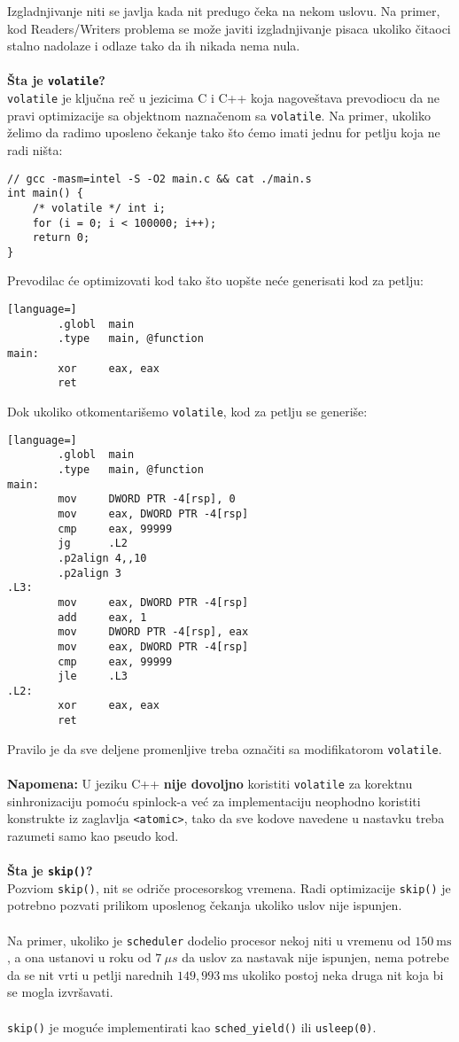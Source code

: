Izgladnjivanje niti se javlja kada nit predugo \v{c}eka na nekom uslovu. Na primer, kod Readers/Writers problema se mo\v{z}e javiti izgladnjivanje pisaca ukoliko \v{c}itaoci stalno nadolaze i odlaze tako da ih nikada nema nula.
\\\\
\textbf{\v{S}ta je \texttt{volatile}?}\\
\texttt{volatile} je klju\v{c}na re\v{c} u jezicima C i C++ koja nagove\v{s}tava prevodiocu da ne pravi optimizacije sa objektnom nazna\v{c}enom sa \texttt{volatile}.
Na primer, ukoliko \v{z}elimo da radimo uposleno \v{c}ekanje tako \v{s}to \'{c}emo imati jednu for petlju koja ne radi ni\v{s}ta:
\begin{lstlisting}
// gcc -masm=intel -S -O2 main.c && cat ./main.s
int main() {
    /* volatile */ int i;
    for (i = 0; i < 100000; i++);
    return 0;
}
\end{lstlisting}
Prevodilac \'{c}e optimizovati kod tako \v{s}to uop\v{s}te ne\'{c}e generisati kod za petlju:
\begin{lstlisting}[language=]
        .globl  main
        .type   main, @function
main:
        xor     eax, eax
        ret
\end{lstlisting}
Dok ukoliko otkomentari\v{s}emo \texttt{volatile}, kod za petlju se generi\v{s}e:
\begin{lstlisting}[language=]
        .globl  main
        .type   main, @function
main:
        mov     DWORD PTR -4[rsp], 0
        mov     eax, DWORD PTR -4[rsp]
        cmp     eax, 99999
        jg      .L2
        .p2align 4,,10
        .p2align 3
.L3:
        mov     eax, DWORD PTR -4[rsp]
        add     eax, 1
        mov     DWORD PTR -4[rsp], eax
        mov     eax, DWORD PTR -4[rsp]
        cmp     eax, 99999
        jle     .L3
.L2:
        xor     eax, eax
        ret
\end{lstlisting}
Pravilo je da sve deljene promenljive treba ozna\v{c}iti sa modifikatorom \texttt{volatile}. 
\\\\
\textbf{Napomena:} U jeziku C++ \textbf{nije dovoljno} koristiti \texttt{volatile} za korektnu sinhronizaciju pomo\'{c}u spinlock-a ve\'{c} za implementaciju neophodno koristiti konstrukte iz zaglavlja \texttt{<atomic>}, tako da sve kodove navedene u nastavku treba razumeti samo kao pseudo kod.
\\\\
\textbf{\v{S}ta je \texttt{skip()}?}\\
Pozviom \texttt{skip()}, nit se odri\v{c}e procesorskog vremena. Radi optimizacije \texttt{skip()} je potrebno pozvati prilikom uposlenog \v{c}ekanja ukoliko uslov nije ispunjen. 
\\\\
Na primer, ukoliko je \texttt{scheduler} dodelio procesor nekoj niti u vremenu od $150\ \textrm{ms}$, a ona ustanovi u roku od $7\ \mu s$ da uslov za nastavak nije ispunjen, nema potrebe da se nit vrti u petlji narednih $149,993\ \textrm{ms}$ ukoliko postoj neka druga nit koja bi se mogla izvr\v{s}avati.
\\\\
\texttt{skip()} je mogu\'{c}e implementirati kao \texttt{sched\_yield()} ili \texttt{usleep(0)}.